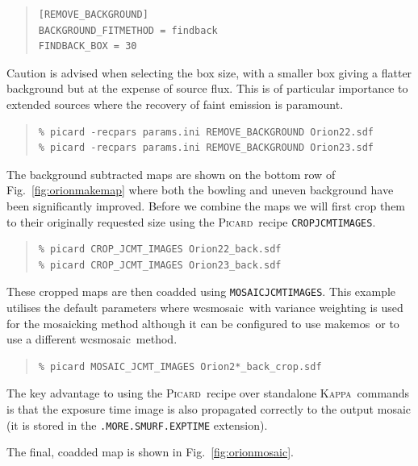 \documentclass[twoside,11pt]{article}
\newcommand{\xref}[3]{#1}
\renewcommand{\_}{\texttt{\symbol{95}}}
\newenvironment{myquote}{\begin{quote}\begin{small}}{\end{small}\end{quote}}
\newcommand{\Kappa}{\xref{\textsc{Kappa}}{sun95}{}}
\newcommand{\picard}{\xref{\textsc{Picard}}{sun231}{}}
\newcommand{\drrecipe}[1]{\texttt{#1}}
\newcommand{\task}[1]{\textsf{#1}}
\newcommand{\wcsmosaic}{\xref{\task{wcsmosaic}}{sun95}{WCSMOSAIC}}
\newcommand{\makemos}{\xref{\task{makemos}}{sun139}{MAKEMOS}}
\begin{document}
\begin{myquote}
\begin{verbatim}
[REMOVE_BACKGROUND]
BACKGROUND_FITMETHOD = findback
FINDBACK_BOX = 30
\end{verbatim}
\end{myquote}

Caution is advised when selecting the box size, with a smaller box
giving a flatter background but at the expense of source flux. This is
of particular importance to extended sources where the recovery of
faint emission is paramount.

\begin{myquote}
\begin{verbatim}
% picard -recpars params.ini REMOVE_BACKGROUND Orion22.sdf
% picard -recpars params.ini REMOVE_BACKGROUND Orion23.sdf
\end{verbatim}
\end{myquote}

The background subtracted maps are shown on the bottom row of
Fig.~\ref{fig:orionmakemap} where both the bowling and uneven
background have been significantly improved. Before we combine the
maps we will first crop them to their originally requested size using
the \picard\ recipe \drrecipe{CROP\_JCMT\_IMAGES}.
\begin{myquote}
\begin{verbatim}
% picard CROP_JCMT_IMAGES Orion22_back.sdf
% picard CROP_JCMT_IMAGES Orion23_back.sdf
\end{verbatim}
\end{myquote}

These cropped maps are then coadded using \drrecipe{MOSAIC\_JCMT\_IMAGES}. This
example utilises the default parameters where \wcsmosaic\ with variance
weighting is used for the mosaicking method although it can be
configured to use \makemos\ or to use a different \wcsmosaic\ method.
\begin{myquote}
\begin{verbatim}
% picard MOSAIC_JCMT_IMAGES Orion2*_back_crop.sdf
\end{verbatim}
\end{myquote}

The key advantage to using the \picard\ recipe over standalone \Kappa\
commands is that the exposure time image is also propagated correctly
to the output mosaic (it is stored in the \texttt{.MORE.SMURF.EXP\_TIME} extension).

The final, coadded map is shown in Fig.~\ref{fig:orionmosaic}.
\end{document}
